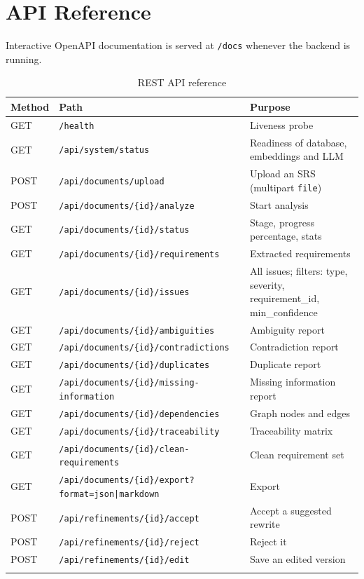\documentclass[11pt,a4paper]{article}
\begin{document}
\section{API Reference}

Interactive OpenAPI documentation is served at \texttt{/docs} whenever the
backend is running.

\begin{longtable}{p{1.6cm} p{6.4cm} p{5.6cm}}
\toprule
\textbf{Method} & \textbf{Path} & \textbf{Purpose} \\
\midrule
\endhead
GET & \texttt{/health} & Liveness probe \\
GET & \texttt{/api/system/status} & Readiness of database, embeddings and LLM \\
POST & \texttt{/api/documents/upload} & Upload an SRS (multipart \texttt{file}) \\
POST & \texttt{/api/documents/\{id\}/analyze} & Start analysis \\
GET & \texttt{/api/documents/\{id\}/status} & Stage, progress percentage, stats \\
GET & \texttt{/api/documents/\{id\}/requirements} & Extracted requirements \\
GET & \texttt{/api/documents/\{id\}/issues} & All issues; filters: type, severity, requirement\_id, min\_confidence \\
GET & \texttt{/api/documents/\{id\}/ambiguities} & Ambiguity report \\
GET & \texttt{/api/documents/\{id\}/contradictions} & Contradiction report \\
GET & \texttt{/api/documents/\{id\}/duplicates} & Duplicate report \\
GET & \texttt{/api/documents/\{id\}/missing-information} & Missing information report \\
GET & \texttt{/api/documents/\{id\}/dependencies} & Graph nodes and edges \\
GET & \texttt{/api/documents/\{id\}/traceability} & Traceability matrix \\
GET & \texttt{/api/documents/\{id\}/clean-requirements} & Clean requirement set \\
GET & \texttt{/api/documents/\{id\}/export?format=json|markdown} & Export \\
POST & \texttt{/api/refinements/\{id\}/accept} & Accept a suggested rewrite \\
POST & \texttt{/api/refinements/\{id\}/reject} & Reject it \\
POST & \texttt{/api/refinements/\{id\}/edit} & Save an edited version \\
\bottomrule
\caption{REST API reference}
\end{longtable}
\end{document}
